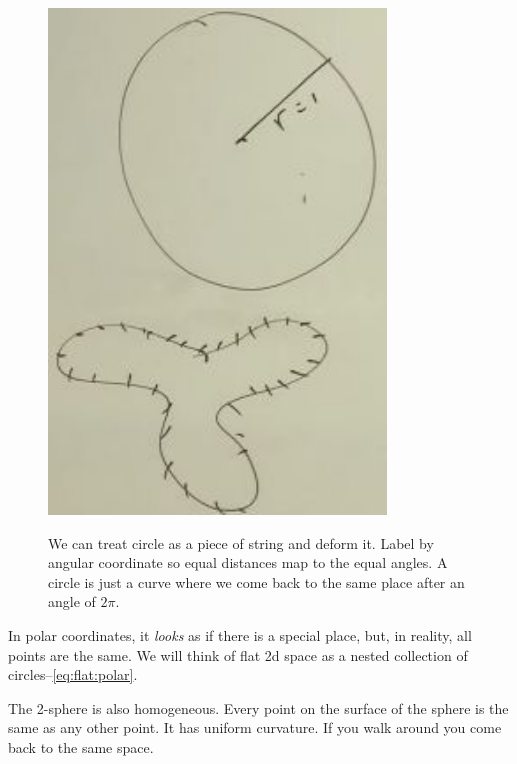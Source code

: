\documentclass[]{article}
\begin{document}
\begin{figure}[H]
	\caption[We can treat a circle as a piece of string and deform it]{We can treat circle as a piece of string and deform it. Label by angular coordinate so equal distances map to the equal angles. A circle is just a curve where we come back to the same place after an angle of $2\pi$.}
	\begin{center}
		\includegraphics[width=0.8\textwidth]{cosmo-3-1-sphere}\label{fig:cosmo-3-1-sphere}
	\end{center}
\end{figure}

In polar coordinates, it \emph{looks} as if there is a special place, but, in reality, all points are the same. We will think of flat 2d space as a nested collection of circles--\eqref{eq:flat:polar}. 

The 2-sphere is also homogeneous. Every point on the surface of the sphere is the same as any other point. It has uniform curvature. If you walk around you come back to the same space.
\end{document}
